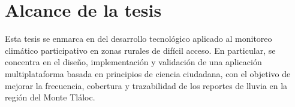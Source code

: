 




\section{Alcance de la tesis}

Esta tesis se enmarca en del desarrollo tecnológico aplicado al monitoreo climático participativo en zonas rurales de difícil acceso. En particular, se concentra en el diseño, implementación y validación de una aplicación multiplataforma basada en principios de ciencia ciudadana, con el objetivo de mejorar la frecuencia, cobertura y trazabilidad de los reportes de lluvia en la región del Monte Tláloc.

